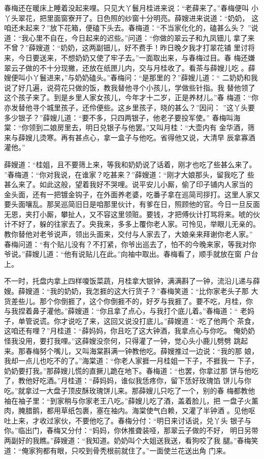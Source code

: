 春梅还在暖床上睡着没起来哩。只见大丫鬟月桂进来说：“老薛来了。”春梅便叫
小丫头翠花，把里面窗寮开了。日色照的纱窗十分明亮。薛嫂进来说道：“奶奶，
这咱还未起来？”放下花箱，便磕下头去。春梅道：“不当家化化的，磕甚么头？
”说道：“我心里不自在，今日起来的迟些。”问道：“你做的翠云子和九凤钿儿
拿了来不曾？”薛嫂道：“奶奶，这两副钿儿，好不费手！昨日晚夕我才打翠花铺
里讨将来，今日要送来，不想奶奶又使了牢子去。”一面取出来，与春梅过目。春
梅还嫌翠云子做的不十分现撇，还放在纸匣儿内，交与月桂收了。看茶与薛嫂儿吃
。薛嫂便叫小丫鬟进来，”与奶奶磕头。”春梅问：“是那里的？”薛嫂儿道：“
二奶奶和我说了好几遍，说荷花只做的饭，教我替他寻个小孩儿，学做些针指。我
替他领了这个孩子来了。到是乡里人家女孩儿，今年才十二岁，正是养材儿。”春
梅道：“你亦发替他寻个城里孩子，还伶便些。这乡里孩子，晓的甚么？”因问：
”这丫头要多少银子？”薛嫂儿道：“要不多，只四两银子，他老子要投军使。”
春梅叫海棠：“你领到二娘房里去，明日兑银子与他罢。”又叫月桂：“大壶内有
金华酒，筛来与薛嫂儿烫寒。再有甚点心，拿一盒子与他吃。省得他又说，大清早
辰拿寡酒灌他。”

薛嫂道：“桂姐，且不要筛上来，等我和奶奶说了话着，刚才也吃了些甚么来了。
”春梅道：“你对我说，在谁家？吃甚来？”薛嫂道：“刚才大娘那头，留我吃了
些甚么来了。如此这般，望着我好不哭哩。说平安儿小厮，偷了印子铺内人家当的
金头面，还有一把镀金钩子，在外面养老婆，吃番子拿在巡简司拶打。这里人家又
要头面嚷乱。那吴巡简旧日是咱那里伙计，有爹在日，照顾他的官。今日一旦反面
无恩，夹打小厮，攀扯人，又不容这里领赃。要钱，才把傅伙计打骂将来。唬的伙
计不好了，躲的往家去了。央我来，多多上覆你老人家。可怜见，举眼儿无亲的。
教你替他对老爷说声，领出头面来，交付与人家去了，大娘亲来拜谢你老人家。”
春梅问道：“有个贴儿没有？不打紧，你爷出巡去了，怕不的今晚来家，等我对你
爷说。”薛嫂儿道：“他有说贴儿在此。”向袖中取出。春梅看了，顺手就放在窗
户台上。

不一时，托盘内拿上四样嗄饭菜蔬，月桂拿大银钟，满满斟了一钟，流沿儿递与薛
嫂。薛嫂道：“我的奶奶，我怎捱的这大行货子？”春梅笑道：“比你家老头子那
大货差些儿。那个你倒捱了，这个你倒捱不的，好歹与我捱了。要不吃，月桂，你
与我捏着鼻子灌他。”薛嫂道：“你且拿了点心，与我打个底儿着。”春梅道：“
老妈子，单管说谎。你才说吃了来，这回又说没打底儿。”薛嫂道：“吃了他两个
茶食，这咱还有哩？”月桂道：“薛妈妈，你且吃了这大钟酒，我拿点心与你吃。
俺奶奶怪我没用，要打我哩。”这薛嫂没奈何，只得灌了一钟，觉心头小鹿儿劈劈
跳起来。那春梅努个嘴儿，又叫海棠斟满一钟教他吃。薛嫂推过一边说：“我的那
娘，我却一点儿也吃不的了。”海棠道：“你老人家捱一月桂姐一下子，不捱我一
下子，奶奶要打我。”那薛嫂儿慌的直撅儿跪在地下。春梅道：“也罢，你拿过那
饼与他吃了，教他好吃酒。”月桂道：“薛妈妈，谁似我恁疼你，留下恁好玫瑰馅
饼儿与你吃。”就拿过一大盘子顶皮酥玫瑰饼儿来。那薛嫂儿只吃了一个，别的春
梅都教他袖在袖子里：“到家稍与你家老王八吃。”薛嫂儿吃了酒，盖着脸儿，把
一盘子火薰肉，腌腊鹅，都用草纸包裹，塞在袖内。海棠使气白赖，又灌了半钟酒
。见他呕吐上来，才收过家伙，不要他吃了。春梅分付：“明日来讨话说，兑丫头
银子与你。”临出门，春梅又分付：“妈妈，你休推聋装哑，那翠云子做的不好，
明日另带两副好的我瞧。”薛嫂道：“我知道。奶奶叫个大姐送我送，看狗咬了我
腿。”春梅笑道：“俺家狗都有眼，只咬到骨秃根前就住了。”一面使兰花送出角
门来。

